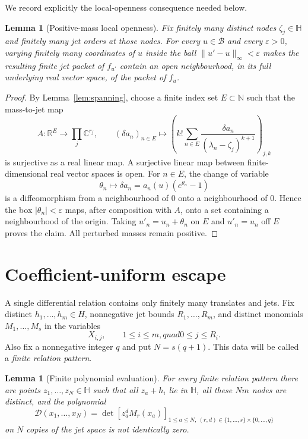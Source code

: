 \documentclass[11pt]{article}
\newtheorem{lemma}[theorem]{Lemma}
\newcommand{\C}{\mathbb C}
\newcommand{\R}{\mathbb R}
\newcommand{\N}{\mathbb N}
\newcommand{\HH}{\mathbb H}
\newcommand{\cB}{\mathcal B}
\begin{document}
We record explicitly the local-openness consequence needed below.

\begin{lemma}[Positive-mass local openness]\label{lem:openness}
Fix finitely many distinct nodes $\zeta_j\in\HH$ and finitely many jet orders at those nodes.
For every $u\in\cB$ and every $\varepsilon>0$, varying finitely many coordinates of $u$ inside
the ball $\|u'-u\|_\infty<\varepsilon$ makes the resulting finite jet packet of $f_{u'}$ contain
an open neighbourhood, in its full underlying real vector space, of the packet of $f_u$.
\end{lemma}

\begin{proof}
By Lemma~\ref{lem:spanning}, choose a finite index set $E\subset\N$ such that the mass-to-jet map
\[
  A:\R^E\longrightarrow\prod_j\C^{r_j},\qquad
  (\delta a_n)_{n\in E}\longmapsto
  \left(k!\sum_{n\in E}\frac{\delta a_n}
  {(\lambda_n-\zeta_j)^{k+1}}\right)_{j,k}
\]
is surjective as a real linear map.  A surjective linear map between finite-dimensional real
vector spaces is open.  For $n\in E$, the change of variable
\[
  \theta_n\longmapsto
  \delta a_n=a_n(u)(e^{\theta_n}-1)
\]
is a diffeomorphism from a neighbourhood of $0$ onto a neighbourhood of $0$.  Hence the box
$|\theta_n|<\varepsilon$ maps, after composition with $A$, onto a set containing a neighbourhood
of the origin.  Taking $u'_n=u_n+\theta_n$ on $E$ and $u'_n=u_n$ off $E$ proves the claim.  All
perturbed masses remain positive.
\end{proof}

\section{Coefficient-uniform escape}

A single differential relation contains only finitely many translates and jets.  Fix distinct
$h_1,\ldots,h_m\in H$, nonnegative jet bounds $R_1,\ldots,R_m$, and distinct monomials
$M_1,\ldots,M_s$ in the variables
\[
  X_{i,j},\qquad 1\leq i\leq m,quad 0\leq j\leq R_i.
\]
Also fix a nonnegative integer $q$ and put $N=s(q+1)$.  This data will be called a
\emph{finite relation pattern}.

\begin{lemma}[Finite polynomial evaluation]\label{lem:evaluation}
For every finite relation pattern there are points $z_1,\ldots,z_N\in\HH$ such that
all $z_a+h_i$ lie in $\HH$, all these $Nm$ nodes are distinct, and the polynomial
\begin{equation}\label{eq:detpoly}
  \mathcal D(x_1,\ldots,x_N)=
  \det\left[z_a^dM_r(x_a)\right]_{
    1\leq a\leq N,\ (r,d)\in\{1,\ldots,s\}\times\{0,\ldots,q\}}
\end{equation}
on $N$ copies of the jet space is not identically zero.
\end{lemma}
\end{document}
